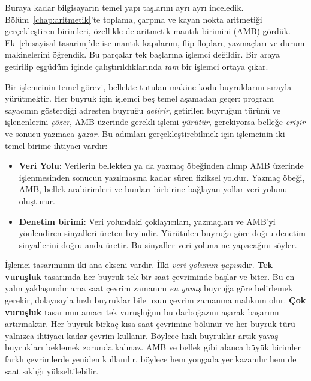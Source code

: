 Buraya kadar bilgisayarın temel yapı taşlarını ayrı ayrı inceledik. Bölüm~\ref{chap:aritmetik}'te toplama, çarpma ve kayan nokta aritmetiği gerçekleştiren birimleri, özellikle de aritmetik mantık birimini (AMB) gördük. Ek~\ref{ch:sayisal-tasarim}'de ise mantık kapılarını, flip-flopları, yazmaçları ve durum makinelerini öğrendik. Bu parçalar tek başlarına işlemci değildir. Bir araya getirilip eşgüdüm içinde çalıştırıldıklarında \emph{tam} bir işlemci ortaya çıkar.

Bir işlemcinin temel görevi, bellekte tutulan makine kodu buyruklarını sırayla yürütmektir. Her buyruk için işlemci beş temel aşamadan geçer: program sayacının gösterdiği adresten buyruğu \emph{getirir}, getirilen buyruğun türünü ve işlenenlerini \emph{çözer}, AMB üzerinde gerekli işlemi \emph{yürütür}, gerekiyorsa belleğe \emph{erişir} ve sonucu yazmaca \emph{yazar}. Bu adımları gerçekleştirebilmek için işlemcinin iki temel birime ihtiyacı vardır:

\begin{itemize}
\item \textbf{Veri Yolu}: Verilerin bellekten ya da yazmaç öbeğinden alınıp AMB üzerinde işlenmesinden sonucun yazılmasına kadar süren fiziksel yoldur. Yazmaç öbeği, AMB, bellek arabirimleri ve bunları birbirine bağlayan yollar veri yolunu oluşturur.
\item \textbf{Denetim birimi}: Veri yolundaki çoklayıcıları, yazmaçları ve AMB'yi yönlendiren sinyalleri üreten beyindir. Yürütülen buyruğa göre doğru denetim sinyallerini doğru anda üretir. Bu sinyaller veri yoluna ne yapacağını söyler.
\end{itemize}

İşlemci tasarımının iki ana ekseni vardır. İlki \emph{veri yolunun yapısı}dır. \textbf{Tek vuruşluk} tasarımda her buyruk tek bir saat çevriminde başlar ve biter. Bu en yalın yaklaşımdır ama saat çevrim zamanını \emph{en yavaş} buyruğa göre belirlemek gerekir, dolayısıyla hızlı buyruklar bile uzun çevrim zamanına mahkum olur. \textbf{Çok vuruşluk} tasarımın amacı tek vuruşluğun bu darboğazını aşarak başarımı artırmaktır. Her buyruk birkaç kısa saat çevrimine bölünür ve her buyruk türü yalnızca ihtiyacı kadar çevrim kullanır. Böylece hızlı buyruklar artık yavaş buyrukları beklemek zorunda kalmaz. AMB ve bellek gibi alanca büyük birimler farklı çevrimlerde yeniden kullanılır, böylece hem yongada yer kazanılır hem de saat sıklığı yükseltilebilir.

